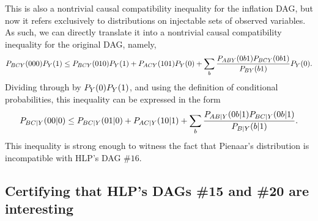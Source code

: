 \documentclass[aps,english,10pt,superscriptaddress,onecolumn,twoside,longbibliography,pra,floatfix,fleqn,nofootinbib]{revtex4-1}%
\theoremstyle{definition}
\newcommand{\p}[2][]{{P_{#1}}\parenths{#2}}
\DeclarePairedDelimiter{\parenths}{\lparen}{\rparen}
\begin{document}
This is also a nontrivial causal compatibility inequality for the inflation DAG, but now it refers exclusively to distributions on injectable sets of observed variables.  As such, we can directly translate it into a nontrivial causal compatibility inequality for the original DAG, namely, 
\begin{align}\label{ntccineqinflationDAG3}
    \p[B C Y ]{000}\p[Y  ]{1} \leq \p[B  C Y]{010} \p[ Y ]{1} + \p[A C Y ]{10 1}\p[Y]{0}+\sum_{b} \frac{P_{A B Y}(0 b 1) P_{ B C Y}(0 b 1) }{P_{B Y}(b 1)} \p[ Y]{0}.
\end{align}
Dividing through by $\p[Y  ]{0}\p[Y  ]{1}$, and using the definition of conditional probabilities, 
this inequality can be expressed in the form
\begin{align}\label{ntccineqDAG}
    \p[B C |Y ]{00|0} \leq \p[B  C| Y]{01|0} + \p[A C |Y ]{10 |1}+\sum_{b} \frac{P_{A B| Y}(0 b |1) P_{ B C |Y}(0 b |1) }{P_{B |Y}(b| 1)} .
\end{align}
This inequality is strong enough to witness the fact that Pienaar's distribution is incompatible with HLP's DAG $\#16$.





\subsection{Certifying that HLP's DAGs \#15 and \#20 are interesting} 
\end{document}
